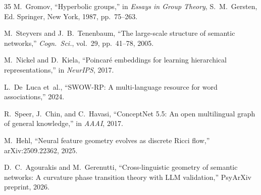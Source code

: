 \documentclass[11pt,a4paper]{article}
\begin{document}
\begin{thebibliography}{35}
M.~Gromov,
``Hyperbolic groups,''
in \emph{Essays in Group Theory}, S.~M.~Gersten, Ed. Springer, New York, 1987, pp.~75--263.

M.~Steyvers and J.~B.~Tenenbaum, ``The large-scale structure of semantic networks,'' \emph{Cogn.~Sci.}, vol.~29, pp.~41--78, 2005.

M.~Nickel and D.~Kiela, ``Poincar\'e embeddings for learning hierarchical representations,'' in \emph{NeurIPS}, 2017.

L.~De~Luca et~al., ``SWOW-RP: A multi-language resource for word associations,'' 2024.

R.~Speer, J.~Chin, and C.~Havasi, ``ConceptNet 5.5: An open multilingual graph of general knowledge,'' in \emph{AAAI}, 2017.

M.~Hehl,
``Neural feature geometry evolves as discrete Ricci flow,''
arXiv:2509.22362, 2025.

D.~C.~Agourakis and M.~Gerenutti, ``Cross-linguistic geometry of semantic networks: A curvature phase transition theory with LLM validation,'' PsyArXiv preprint, 2026.

\end{thebibliography}
\end{document}
